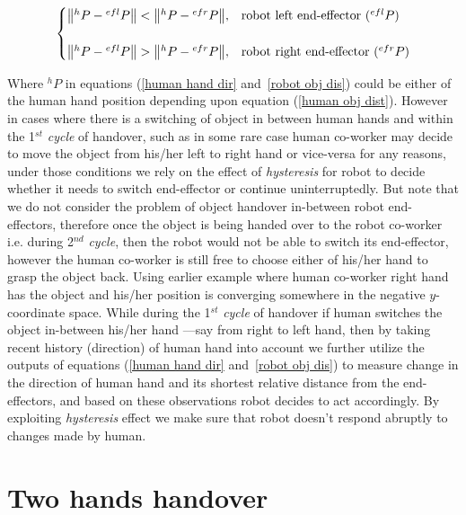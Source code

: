 \begin{equation}\label{robot obj dis}
\centering
\begin{cases}
\norm{{}^{h}{P} - {}^{efl}{P}} < \norm{{}^{h}{P} - {}^{efr}{P}}, &  \text{robot left end-effector (${}^{efl}{P}$)} \\
\\
\norm{{}^{h}{P} - {}^{efl}{P}} > \norm{{}^{h}{P} - {}^{efr}{P}}, &  \text{robot right end-effector (${}^{efr}{P}$)}
\end{cases}
\end{equation}


Where ${}^{h}{P}$ in equations (\ref{human hand dir} and~\ref{robot obj dis}) could be either of the human hand position depending upon equation (\ref{human obj dist}). However in cases where there is a switching of object in between human hands and within the 1$^{st}$ \textit{cycle} of handover, such as in some rare case human co-worker may decide to move the object from his/her left to right hand or vice-versa for any reasons, under those conditions we rely on the effect of \textit{hysteresis} for robot to decide whether it needs to switch end-effector or continue uninterruptedly. But note that we do not consider the problem of object handover in-between robot end-effectors, therefore once the object is being handed over to the robot co-worker i.e. during 2$^{nd}$ \textit{cycle}, then the robot would not be able to switch its end-effector, however the human co-worker is still free to choose either of his/her hand to grasp the object back. Using earlier example where human co-worker right hand has the object and his/her position is converging somewhere in the negative $y$-coordinate space. While during the 1$^{st}$ \textit{cycle} of handover if human switches the object in-between his/her hand ---say from right to left hand, then by taking recent history (direction) of human hand into account we further utilize the outputs of equations (\ref{human hand dir} and~\ref{robot obj dis}) to measure change in the direction of human hand and its shortest relative distance from the end-effectors, and based on these observations robot decides to act accordingly. By exploiting \textit{hysteresis} effect we make sure that robot doesn't respond abruptly to changes made by human.


\clearpage

\section{Two hands handover}\label{both hands together}

